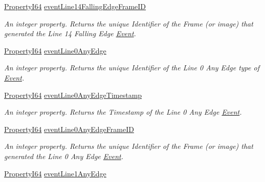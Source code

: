 \begin{DoxyCompactItemize}
\hyperlink{group___common_interface_ga81749b2696755513663492664a18a893}{Property\+I64} \hyperlink{classmv_i_m_p_a_c_t_1_1acquire_1_1_gen_i_cam_1_1_event_control_a9f6b5f77eed8f7ae5f55061d37da5b92}{event\+Line14\+Falling\+Edge\+Frame\+I\+D}
\begin{DoxyCompactList}\small\item\em An integer property. Returns the unique Identifier of the Frame (or image) that generated the Line 14 Falling Edge \hyperlink{classmv_i_m_p_a_c_t_1_1acquire_1_1_event}{Event}. \end{DoxyCompactList}\item 
\hyperlink{group___common_interface_ga81749b2696755513663492664a18a893}{Property\+I64} \hyperlink{classmv_i_m_p_a_c_t_1_1acquire_1_1_gen_i_cam_1_1_event_control_af8dd1cea2f256d419321e1fcca94507d}{event\+Line0\+Any\+Edge}
\begin{DoxyCompactList}\small\item\em An integer property. Returns the unique Identifier of the Line 0 Any Edge type of \hyperlink{classmv_i_m_p_a_c_t_1_1acquire_1_1_event}{Event}. \end{DoxyCompactList}\item 
\hyperlink{group___common_interface_ga81749b2696755513663492664a18a893}{Property\+I64} \hyperlink{classmv_i_m_p_a_c_t_1_1acquire_1_1_gen_i_cam_1_1_event_control_a80478b6a3c446bd2b821b11c46228039}{event\+Line0\+Any\+Edge\+Timestamp}
\begin{DoxyCompactList}\small\item\em An integer property. Returns the Timestamp of the Line 0 Any Edge \hyperlink{classmv_i_m_p_a_c_t_1_1acquire_1_1_event}{Event}. \end{DoxyCompactList}\item 
\hyperlink{group___common_interface_ga81749b2696755513663492664a18a893}{Property\+I64} \hyperlink{classmv_i_m_p_a_c_t_1_1acquire_1_1_gen_i_cam_1_1_event_control_a778b223c6ffe62959922b1d1a0bc5ec2}{event\+Line0\+Any\+Edge\+Frame\+I\+D}
\begin{DoxyCompactList}\small\item\em An integer property. Returns the unique Identifier of the Frame (or image) that generated the Line 0 Any Edge \hyperlink{classmv_i_m_p_a_c_t_1_1acquire_1_1_event}{Event}. \end{DoxyCompactList}\item 
\hyperlink{group___common_interface_ga81749b2696755513663492664a18a893}{Property\+I64} \hyperlink{classmv_i_m_p_a_c_t_1_1acquire_1_1_gen_i_cam_1_1_event_control_a627dee778fe30f88c3c380fbd167b74c}{event\+Line1\+Any\+Edge}

\end{DoxyCompactItemize}
